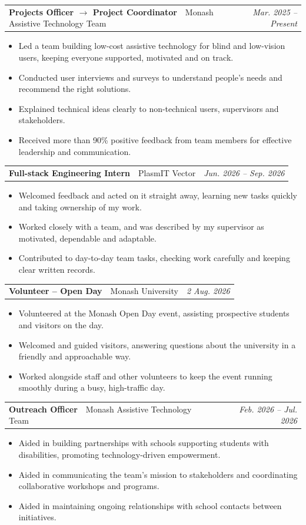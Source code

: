 \documentclass[10pt,a4paper]{article}
\makeatletter
\newcommand{\resumeJob}[4]{%
  \par\addvspace{1pt}%
  \begin{tabularx}{\textwidth}{@{}Xr@{}}
    \textbf{#1}{\color{muted}\ \textbar{}\ #3} & \textit{#2}
  \end{tabularx}
  \vspace{-11pt}
}
\makeatother
\begin{document}
\resumeJob{Projects Officer $\rightarrow$ Project Coordinator}{Mar. 2025 -- Present}{Monash Assistive Technology Team}{Clayton, VIC}
\begin{itemize}
  \item Led a team building low-cost assistive technology for blind and low-vision users, keeping everyone supported, motivated and on track.
  \item Conducted user interviews and surveys to understand people's needs and recommend the right solutions.
  \item Explained technical ideas clearly to non-technical users, supervisors and stakeholders.
  \item Received more than 90\% positive feedback from team members for effective leadership and communication.
\end{itemize}

\resumeJob{Full-stack Engineering Intern}{Jun. 2026 -- Sep. 2026}{PlasmIT Vector}{Docklands, VIC (Remote)}
\begin{itemize}
  \item Welcomed feedback and acted on it straight away, learning new tasks quickly and taking ownership of my work.
  \item Worked closely with a team, and was described by my supervisor as motivated, dependable and adaptable.
  \item Contributed to day-to-day team tasks, checking work carefully and keeping clear written records.
\end{itemize}

\resumeJob{Volunteer -- Open Day}{2 Aug. 2026}{Monash University}{Clayton, VIC}
\begin{itemize}
  \item Volunteered at the Monash Open Day event, assisting prospective students and visitors on the day.
  \item Welcomed and guided visitors, answering questions about the university in a friendly and approachable way.
  \item Worked alongside staff and other volunteers to keep the event running smoothly during a busy, high-traffic day.
\end{itemize}

\resumeJob{Outreach Officer}{Feb. 2026 -- Jul. 2026}{Monash Assistive Technology Team}{Clayton, VIC}
\begin{itemize}
  \item Aided in building partnerships with schools supporting students with disabilities, promoting technology-driven empowerment.
  \item Aided in communicating the team's mission to stakeholders and coordinating collaborative workshops and programs.
  \item Aided in maintaining ongoing relationships with school contacts between initiatives.
\end{itemize}
\end{document}
